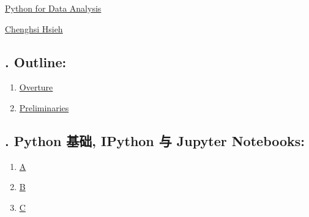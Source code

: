 \documentclass[11pt]{article}
\begin{document}
	\kaishu 
	\setcounter{section}{0}
	\begin{center}
		{\LARGE  \href{https://www.youtube.com/playlist?list=PL8xPPUJdubH5LMOXzbV3wRH9hUPXXjwXb}{Python for Data Analysis}}
		
		
		{\large \href{https://fin.ntub.edu.tw/p/412-1037-121.php?Lang=en}{Chenghsi Hsieh}}
	\end{center}
\setcounter{page}{1}


\subsection*{\small {}. Outline:}

\vspace{-0.5cm}

\begin{multicols}{3}
	\begin{enumerate}
		\item \href{https://mp.weixin.qq.com/s/2KCK1HsCp8NgbI1YcpwEJw}{Overture}	%
		\item \href{https://mp.weixin.qq.com/s/ScI-Nkq3tHoh-_w4WixSpA}{Preliminaries}	%
	\end{enumerate}
\end{multicols}

\subsection*{\small {}. Python 基础, IPython 与 Jupyter Notebooks:}

\vspace{-0.5cm}

\begin{multicols}{6}
	\begin{enumerate}
		\item \href{https://mp.weixin.qq.com/s/pPoonk4pJvnB_KsNyH3y6g}{A}	%
		\item \href{https://mp.weixin.qq.com/s/emosklctAq5ndukdrnN0mw}{B}	%
		\item \href{https://mp.weixin.qq.com/s/hbh3xzBvEUb3aL-tRf6EnA}{C}	%
	\end{enumerate}
\end{multicols}
\end{document}
